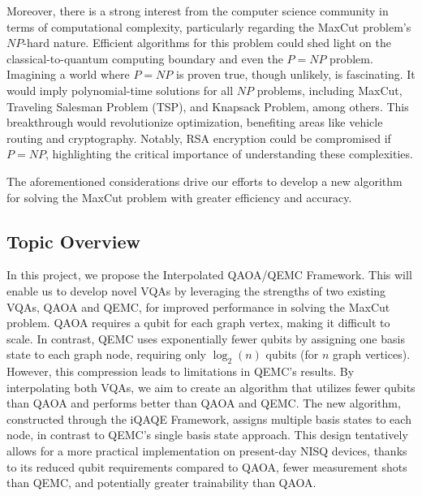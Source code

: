 Moreover, there is a strong interest from the computer science community in terms of computational complexity, particularly regarding the MaxCut problem's $NP$-hard nature. Efficient algorithms for this problem could shed light on the classical-to-quantum computing boundary and even the $P = NP$ problem. Imagining a world where $P = NP$ is proven true, though unlikely, is fascinating. It would imply polynomial-time solutions for all $NP$ problems, including MaxCut, Traveling Salesman Problem (TSP), and Knapsack Problem, among others. This breakthrough would revolutionize optimization, benefiting areas like vehicle routing and cryptography. Notably, RSA encryption could be compromised if $P = NP$, highlighting the critical importance of understanding these complexities.

The aforementioned considerations drive our efforts to develop a new algorithm for solving the MaxCut problem with greater efficiency and accuracy.

\subsection{Topic Overview}
\label{section:overview}
In this project, we propose the Interpolated QAOA/QEMC Framework. This will enable us to develop novel VQAs by leveraging the strengths of two existing VQAs, QAOA and QEMC, for improved performance in solving the MaxCut problem. QAOA requires a qubit for each graph vertex, making it difficult to scale. In contrast, QEMC uses exponentially fewer qubits by assigning one basis state to each graph node, requiring only $\log_2(n)$ qubits (for $n$ graph vertices). However, this compression leads to limitations in QEMC's results. By interpolating both VQAs, we aim to create an algorithm that utilizes fewer qubits than QAOA and performs better than QAOA and QEMC. The new algorithm, constructed through the iQAQE Framework, assigns multiple basis states to each node, in contrast to QEMC's single basis state approach. This design tentatively allows for a more practical implementation on present-day NISQ devices, thanks to its reduced qubit requirements compared to QAOA, fewer measurement shots than QEMC, and potentially greater trainability than QAOA.

